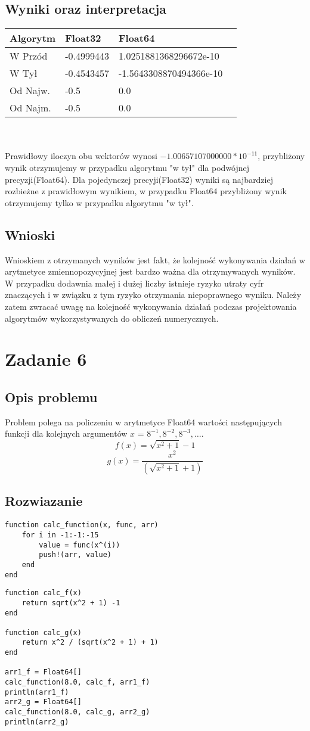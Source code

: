 \documentclass[11pt]{article}
\begin{document}
\subsection{Wyniki oraz interpretacja}
\setlength{\tabcolsep}{2pt}
\renewcommand{\arraystretch}{1.3}
\begin{tabularx}{\textwidth}{|l|X|X|X}
\hline
Algorytm & Float32 & Float64 \\
\hline
W Przód & -0.4999443 & 1.0251881368296672e-10 \\
\hline
W Tył & -0.4543457 & -1.5643308870494366e-10 \\
\hline
Od Najw. & -0.5 & 0.0 \\
\hline
Od Najm. & -0.5 & 0.0 \\
\hline
\end{tabularx} \\
\vspace{25pt} \\
Prawidłowy iloczyn obu wektorów wynosi 
$-1.00657107000000*10^{-11}$, przybliżony wynik otrzymujemy w przypadku algorytmu "w tył" dla podwójnej precyzji(Float64). Dla pojedynczej precyji(Float32) wyniki są najbardziej rozbieżne z prawidłowym wynikiem, w przypadku Float64 przybliżony wynik otrzymujemy tylko w przypadku algorytmu "w tył".
\subsection{Wnioski}
Wnioskiem z otrzymanych wyników jest fakt, że kolejność wykonywania działań w arytmetyce zmiennopozycyjnej jest bardzo ważna dla otrzymywanych wyników. W przypadku dodawnia małej i dużej liczby istnieje ryzyko utraty cyfr znaczących i w związku z tym ryzyko otrzymania niepoprawnego wyniku. Należy zatem zwracać uwagę na kolejność wykonywania działań podczas projektowania algorytmów wykorzystywanych do obliczeń numerycznych. 

\section{Zadanie 6}
\subsection{Opis problemu}
Problem polega na policzeniu w arytmetyce Float64 wartości następujących funkcji dla kolejnych argumentów $x$ = $8^{-1}, 8^{-2}, 8^{-3},\dots.$
$$f(x)=\sqrt{x^2+1}-1$$
$$g(x)=\frac{x^2}{\left(\sqrt{x^2+1}+1\right)}$$
\subsection{Rozwiazanie}
\begin{verbatim}
function calc_function(x, func, arr)
    for i in -1:-1:-15
        value = func(x^(i))
        push!(arr, value)
    end
end
\end{verbatim}
\begin{verbatim}
function calc_f(x)
    return sqrt(x^2 + 1) -1
end

function calc_g(x)
    return x^2 / (sqrt(x^2 + 1) + 1)
end

arr1_f = Float64[]
calc_function(8.0, calc_f, arr1_f)
println(arr1_f)
arr2_g = Float64[]
calc_function(8.0, calc_g, arr2_g)
println(arr2_g)
\end{verbatim}
\end{document}

